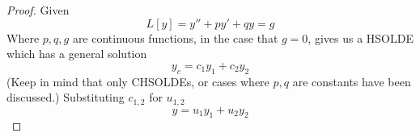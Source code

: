 \documentclass[diffeq.tex]{subfiles}
\begin{document}
    \begin{proof}
        Given
        \begin{equation}
            L[y] = y'' + py' + qy = g
        \end{equation}
        Where $p,q,g$ are continuous functions, in the case that $g = 0$, gives us a HSOLDE which has a general solution
        \begin{equation}
            y_{c} = c_{1}y_{1} + c_{2}y_{2}
        \end{equation}
        (Keep in mind that only CHSOLDEs, or cases where $p, q$ are constants have been discussed.)
        Substituting $c_{1,2}$ for $u_{1,2}$
        \begin{equation}
            y = u_{1}y_{1} + u_{2}y_{2}
        \end{equation}
    \end{proof}
\end{document}
